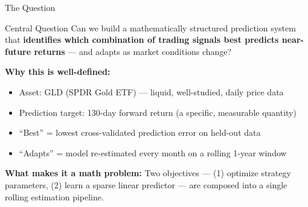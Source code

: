 \documentclass[aspectratio=169]{beamer}
\begin{document}
\begin{frame}{The Question}

  \begin{block}{Central Question}
    Can we build a mathematically structured prediction system that
    \textbf{identifies which combination of trading signals best predicts
    near-future returns} --- and adapts as market conditions change?
  \end{block}

  \vspace{0.6em}
  \textbf{Why this is well-defined:}
  \begin{itemize}
    \item Asset: GLD (SPDR Gold ETF) --- liquid, well-studied, daily price data
    \item Prediction target: 130-day forward return (a specific, measurable quantity)
    \item ``Best'' = lowest cross-validated prediction error on held-out data
    \item ``Adapts'' = model re-estimated every month on a rolling 1-year window
  \end{itemize}

  \vspace{0.5em}
  \textbf{What makes it a math problem:}
  Two objectives — (1) optimize strategy parameters, (2) learn a sparse linear
  predictor — are composed into a single rolling estimation pipeline.

\end{frame}
\end{document}
